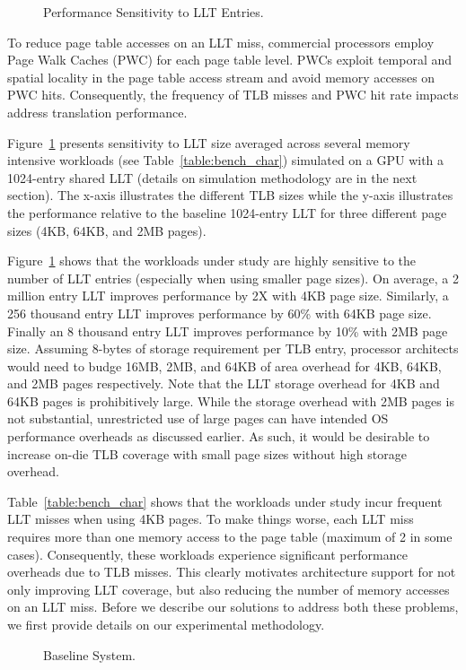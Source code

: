 \begin{figure}[t] 
\vspace{0. in}
\centering
\centerline{}

	\caption{\small Performance Sensitivity to LLT Entries. \normalsize}

\label{fig:tlb_sensitivity} 
\vspace{-0.15 in}
\end{figure}

To reduce page table accesses on an LLT miss, commercial processors
employ Page Walk Caches (PWC) for each page table level. PWCs exploit
temporal and spatial locality in the page table access stream and
avoid memory accesses on PWC hits. Consequently, the frequency of TLB
misses and PWC hit rate impacts address translation performance.

Figure~\ref{fig:tlb_sensitivity} presents sensitivity to LLT size
averaged across several memory intensive workloads (see
Table~\ref{table:bench_char}) simulated on a GPU with a 1024-entry
shared LLT (details on simulation methodology are in the next
section). The x-axis illustrates the different TLB sizes while the
y-axis illustrates the performance relative to the baseline 1024-entry
LLT for three different page sizes (4KB, 64KB, and 2MB pages).



Figure~\ref{fig:tlb_sensitivity} shows that the workloads under study
are highly sensitive to the number of LLT entries (especially when
using smaller page sizes). On average, a 2 million entry LLT improves
performance by 2X with 4KB page size. Similarly, a 256 thousand entry
LLT improves performance by 60\% with 64KB page size. Finally an 8
thousand entry LLT improves performance by 10\% with 2MB page size.
Assuming 8-bytes of storage requirement per TLB entry, processor
architects would need to budge 16MB, 2MB, and 64KB of area overhead
for 4KB, 64KB, and 2MB pages respectively. Note that the LLT storage
overhead for 4KB and 64KB pages is prohibitively large. While the
storage overhead with 2MB pages is not substantial, unrestricted use
of large pages can have intended OS performance overheads as discussed
earlier. As such, it would be desirable to increase on-die TLB
coverage with small page sizes without high storage overhead.

Table~\ref{table:bench_char} shows that the workloads under study
incur frequent LLT misses when using 4KB pages. To make things worse,
each LLT miss requires more than one memory access to the page table
(maximum of 2 in some cases). Consequently, these workloads experience
significant performance overheads due to TLB misses. This clearly
motivates architecture support for not only improving LLT coverage,
but also reducing the number of memory accesses on an LLT miss. Before
we describe our solutions to address both these problems, we first
provide details on our experimental methodology.

\begin{figure}[t]
\vspace{0. in}
\centering
\centerline{}

        \caption{\small Baseline System. \normalsize}

\label{fig:config}
\vspace{-0.15 in}
\end{figure}
